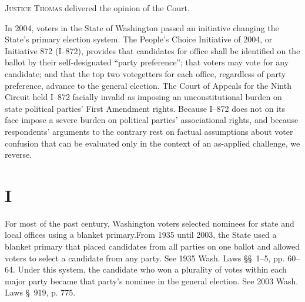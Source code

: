 
\setcounter{page}{444}

  \textsc{Justice Thomas} delivered the opinion of the Court.

  In 2004, voters in the State of Washington passed an initiative
changing the State's primary election system. The People's Choice
Initiative of 2004, or Initiative 872 (I--872), provides that
candidates for office shall be identified on the ballot by their
self-designated ``party preference''; that voters may vote for any
candidate; and that the top two votegetters for each office, regardless
of party preference, advance to the general election. The Court of
Appeals for the Ninth Circuit held I--872 facially invalid as imposing
an unconstitutional burden on state political parties' First Amendment
rights. Because I--872 does not on its face impose a severe burden on
political parties' associational rights, and because respondents'
arguments to the contrary rest on factual assumptions about voter
confusion that can be evaluated only in the context of an as-applied
challenge, we reverse. \newpage 


\section{I}

  For most of the past century, Washington voters selected nominees for
state and local offices using a blanket primary.\footnotemark[1] From 1935 until
2003, the State used a blanket primary that placed candidates from all
parties on one ballot and allowed voters to select a candidate from any
party. See 1935 Wash. Laws \S\S~1--5, pp. 60--64. Under this
system, the candidate who won a plurality of votes within each major
party became that party's nominee in the general election. See 2003
Wash. Laws \S~919, p. 775.

